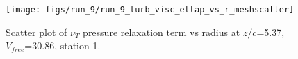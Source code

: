 \begin{figure}[H]
\centering
\texttt{[image: figs/run\_9/run\_9\_turb\_visc\_ettap\_vs\_r\_meshscatter]}
\caption{Scatter plot of $\nu_T$ pressure relaxation term vs radius at $z/c$=5.37, $V_{free}$=30.86, station 1.}
\label{fig:run_9_turb_visc_ettap_vs_r_meshscatter}
\end{figure}


